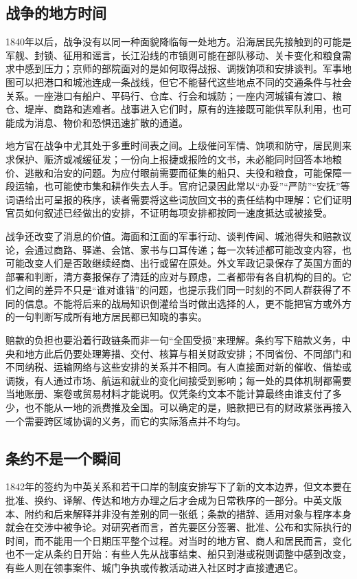 \subsection{战争的地方时间}

1840年以后，战争没有以同一种面貌降临每一处地方。沿海居民先接触到的可能是军舰、封锁、征用和谣言，长江沿线的市镇则可能在部队移动、关卡变化和粮食需求中感到压力；京师的部院面对的是如何取得战报、调拨饷项和安排谈判。军事地图可以把港口和城池连成一条战线，但它不能替代这些地点不同的交通条件与社会关系。一座港口有船户、平码行、仓库、行会和城防；一座内河城镇有渡口、粮仓、堤岸、商路和逃难者。战事进入它们时，原有的连接既可能供军队利用，也可能成为消息、物价和恐惧迅速扩散的通道。

地方官在战争中尤其处于多重时间表之间。上级催问军情、饷项和防守，居民则来求保护、赈济或减缓征发；一份向上报捷或报险的文书，未必能同时回答本地粮价、逃散和治安的问题。为应付眼前需要而征集的船只、夫役和粮食，可能保障一段运输，也可能使市集和耕作失去人手。官府记录因此常以“办妥”“严防”“安抚”等词语给出可呈报的秩序，读者需要将这些词放回文书的责任结构中理解：它们证明官员如何叙述已经做出的安排，不证明每项安排都按同一速度抵达或被接受。

战争还改变了消息的价值。海面和江面的军事行动、谈判传闻、城池得失和赔款议论，会通过商路、驿递、会馆、家书与口耳传递；每一次转述都可能改变内容，也可能改变人们是否敢继续经商、出行或留在原处。外文军政记录保存了英国方面的部署和判断，清方奏报保存了清廷的应对与顾虑，二者都带有各自机构的目的。它们之间的差异不只是“谁对谁错”的问题，也提示我们同一时刻的不同人群获得了不同的信息。不能将后来的战局知识倒灌给当时做出选择的人，更不能把官方或外方的一句判断写成所有地方居民都已知晓的事实。

赔款的负担也要沿着行政链条而非一句“全国受损”来理解。条约写下赔款义务，中央和地方此后仍要处理筹措、交付、核算与相关财政安排；不同省份、不同部门和不同纳税、运输网络与这些安排的关系并不相同。有人直接面对新的催收、借垫或调拨，有人通过市场、航运和就业的变化间接受到影响；每一处的具体机制都需要当地账册、案卷或贸易材料才能说明。仅凭条约文本不能计算最终由谁支付了多少，也不能从一地的派费推及全国。可以确定的是，赔款把已有的财政紧张再接入一个需要跨区域协调的义务，而它的实际落点并不均匀。

\subsection{条约不是一个瞬间}

1842年的签约为中英关系和若干口岸的制度安排写下了新的文本边界，但文本要在批准、换约、译解、传达和地方办理之后才会成为日常秩序的一部分。中英文版本、附约和后来解释并非没有差别的同一张纸；条款的措辞、适用对象与程序本身就会在交涉中被争论。对研究者而言，首先要区分签署、批准、公布和实际执行的时间，而不能用一个日期压平整个过程。对当时的地方官、商人和居民而言，变化也不一定从条约日开始：有些人先从战事结束、船只到港或税则调整中感到改变，有些人则在领事案件、城门争执或传教活动进入社区时才直接遭遇它。

